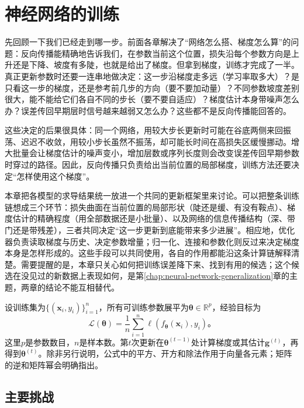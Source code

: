 \chapter{神经网络的训练}
\label{chap:neural-network-training}

先回顾一下我们已经走到哪一步。前面各章解决了“网络怎么搭、梯度怎么算”的问题：反向传播能精确地告诉我们，在参数当前这个位置，损失沿每个参数方向是上升还是下降、坡度有多陡，也就是给出了梯度。但拿到梯度，训练才完成了一半。真正更新参数时还要一连串地做决定：这一步沿梯度走多远（学习率取多大）？是只看这一步的梯度，还是参考前几步的方向（要不要加动量）？不同参数坡度差别很大，能不能给它们各自不同的步长（要不要自适应）？梯度估计本身带噪声怎么办？误差传回早期层时信号越来越弱又怎么办？这些都不是反向传播能回答的。

这些决定的后果很具体：同一个网络，用较大步长更新时可能在谷底两侧来回振荡、迟迟不收敛，用较小步长虽然不振荡，却可能长时间在高损失区缓慢挪动。增大批量会让梯度估计的噪声变小，增加层数或序列长度则会改变误差传回早期参数时穿过的路径。因此，反向传播只负责给出当前位置的局部梯度，训练方法还要决定“怎样使用这个梯度”。

本章把各模型的求导结果统一放进一个共同的更新框架里来讨论。可以把整条训练链想成三个环节：损失曲面在当前位置的局部形状（陡还是缓、有没有鞍点）、梯度估计的精确程度（用全部数据还是小批量）、以及网络的信息传播结构（深、带门还是带残差），三者共同决定“这一步更新到底能带来多少进展”。相应地，优化器负责读取梯度与历史、决定参数增量；归一化、连接和参数化则反过来决定梯度本身是怎样形成的。这些手段可以共同使用，各自的作用都能沿这条计算链解释清楚。需要提醒的是，本章只关心如何把训练误差降下来、找到有用的候选；这个候选在没见过的新数据上表现如何，是第\ref{chap:neural-network-generalization}章的主题，两章的结论不能互相替代。

设训练集为$\{(\bm x_i,y_i)\}_{i=1}^n$，所有可训练参数展平为$\bm\theta\in\mathbb R^p$，经验目标为
\begin{equation}
  \mathcal L(\bm\theta)=\frac1n\sum_{i=1}^n
  \ell(f_{\bm\theta}(\bm x_i),y_i)\text{。}
  \label{eq:training-objective}
\end{equation}
这里$p$是参数数目，$n$是样本数。第$t$次更新在$\bm\theta^{(t-1)}$处计算梯度或其估计$\bm g^{(t)}$，再得到$\bm\theta^{(t)}$。除非另行说明，公式中的平方、开方和除法作用于向量各元素；矩阵的逆和矩阵幂会明确指出。

\section{主要挑战}
\label{sec:training-challenges}

